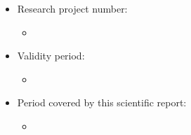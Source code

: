 {\begin{itemize}
          \ifdefined \numFAP
             \item Research project number:
             \begin{itemize}
                 \item[]\textbf{\numFAP}
             \end{itemize}
          \fi
       \item Validity period:
            \begin{itemize}
               \item[]\textbf{\periodVig}
            \end{itemize}
       \item Period covered by this scientific report:
            \begin{itemize}
               \item[]\textbf{\periodRelat}
            \end{itemize}
   \end{itemize}
   \clearpage
}


